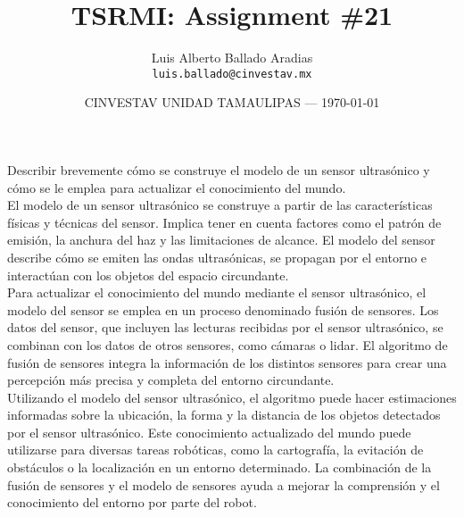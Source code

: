 \documentclass{article}
\title{TSRMI: Assignment \#21} %
\author{Luis Alberto Ballado Aradias\\ \texttt{luis.ballado@cinvestav.mx}} %
\date{CINVESTAV UNIDAD TAMAULIPAS --- \today} %
\begin{document}
\maketitle %


Describir brevemente c\'{o}mo se construye el modelo de un sensor ultras\'{o}nico y c\'{o}mo se le emplea para actualizar el conocimiento del mundo.\\

El modelo de un sensor ultrasónico se construye a partir de las características físicas y técnicas del sensor. Implica tener en cuenta factores como el patrón de emisión, la anchura del haz y las limitaciones de alcance. El modelo del sensor describe cómo se emiten las ondas ultrasónicas, se propagan por el entorno e interactúan con los objetos del espacio circundante.\\

Para actualizar el conocimiento del mundo mediante el sensor ultrasónico, el modelo del sensor se emplea en un proceso denominado fusión de sensores. Los datos del sensor, que incluyen las lecturas recibidas por el sensor ultrasónico, se combinan con los datos de otros sensores, como cámaras o lidar. El algoritmo de fusión de sensores integra la información de los distintos sensores para crear una percepción más precisa y completa del entorno circundante.\\

Utilizando el modelo del sensor ultrasónico, el algoritmo puede hacer estimaciones informadas sobre la ubicación, la forma y la distancia de los objetos detectados por el sensor ultrasónico. Este conocimiento actualizado del mundo puede utilizarse para diversas tareas robóticas, como la cartografía, la evitación de obstáculos o la localización en un entorno determinado. La combinación de la fusión de sensores y el modelo de sensores ayuda a mejorar la comprensión y el conocimiento del entorno por parte del robot.\\
\end{document}
